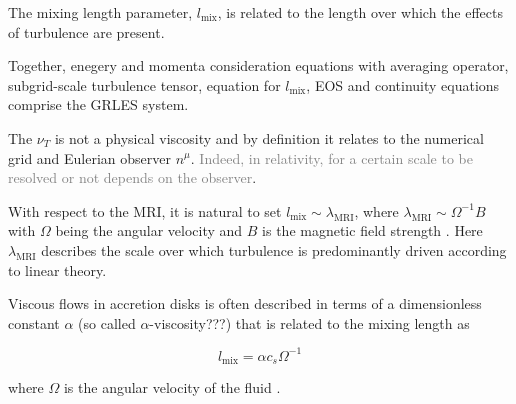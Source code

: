 \documentclass[11pt,a4paper,headinclude=true,DIV=14,BCOR=8mm,chapterprefix,listof=totoc,twoside,openright,abstracton]{scrbook}
\newcommand{\red}[1]{\textcolor{red}{#1}}
\newcommand{\gray}[1]{\textcolor{gray}{#1}}
\begin{document}



The mixing length parameter, $l_{\text{mix}}$, is related to the length over which the effects of turbulence are present. 

Together, enegery and momenta consideration equations with averaging operator, subgrid-scale turbulence tensor, equation for $l_{\text{mix}}$, EOS and continuity equations comprise the GRLES system.


The $\nu_T$ is not a physical viscosity and by definition it relates to the numerical grid and 
Eulerian observer $n^{\mu}$. 
\gray{Indeed, in relativity, for a certain scale to be resolved or not depends on the observer}.



With respect to the MRI, it is natural to set $l_{\text{mix}} \sim \lambda_{\text{MRI}}$, where $\lambda_{\text{MRI}} \sim \Omega^{-1}B$ with $\Omega$ being the angular velocity and $B$ is the magnetic field strength \cite{Duez:2006qe}.
Here $\lambda_{\text{MRI}}$ describes the scale over which turbulence is predominantly driven according to linear theory.


Viscous flows in accretion disks is often described in terms of a dimensionless constant $\alpha$
(so called $\alpha$-viscosity???) that is related to the mixing length as 

\begin{equation}
l_{\text{mix}} = \alpha c_s \Omega^{-1}
\end{equation}

where $\Omega$ is the angular velocity of the fluid \cite{Shakura:1972te}.
\end{document}
